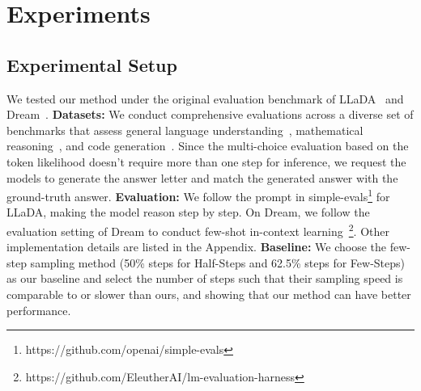 \documentclass{article}
\begin{document}


\section{Experiments}
\subsection{Experimental Setup}
We tested our method under the original evaluation benchmark of LLaDA~\cite{nie2025llada} and Dream~\cite{dream2025}. \textbf{Datasets:} We conduct comprehensive evaluations across a diverse set of benchmarks that assess general language understanding~\cite{hendryckstest2021mmlu}, mathematical reasoning~\cite{cobbe2021gsm8k,lightman2023math500,rein2024gpqa}, and code generation~\cite{chen2021humaneval,austin2021mbpp}. Since the multi-choice evaluation based on the token likelihood doesn't require more than one step for inference, we request the models to generate the answer letter and match the generated answer with the ground-truth answer. \textbf{Evaluation:} We follow the prompt in simple-evals\footnote{https://github.com/openai/simple-evals} for LLaDA, making the model reason step by step. On Dream, we follow the evaluation setting of Dream to conduct few-shot in-context learning~\cite{brown2020language}\footnote{https://github.com/EleutherAI/lm-evaluation-harness}. Other implementation details are listed in the Appendix. \textbf{Baseline:} We choose the few-step sampling method (50\% steps for Half-Steps and 62.5\% steps for Few-Steps) as our baseline and select the number of steps such that their sampling speed is comparable to or slower than ours, and showing that our method can have better performance.
\end{document}
